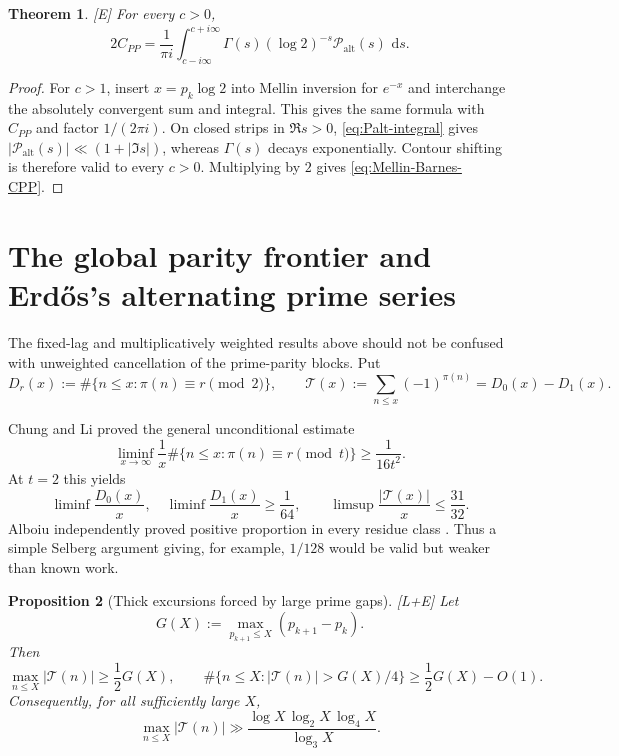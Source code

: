 \documentclass[11pt]{article}
\newtheorem{theorem}{Theorem}[section]
\newtheorem{proposition}[theorem]{Proposition}
\theoremstyle{definition}
\theoremstyle{remark}
\newcommand{\Palt}{\mathcal P_{\mathrm{alt}}}
\newcommand{\status}[1]{\textnormal{\textcolor{accent}{\footnotesize[#1]}}}
\newcommand{\dd}{\,\mathrm d}
\begin{document}
\begin{theorem}\label{thm:Mellin-Barnes-CPP}
\status{E}
For every $c>0$,
\begin{equation}\label{eq:Mellin-Barnes-CPP}
 2C_{PP}=\frac1{\pi i}
 \int_{c-i\infty}^{c+i\infty}
 \Gamma(s)(\log2)^{-s}\Palt(s)\,\dd s.
\end{equation}
\end{theorem}

\begin{proof}
For $c>1$, insert $x=p_k\log2$ into Mellin inversion for $e^{-x}$ and interchange the
absolutely convergent sum and integral.  This gives the same formula with $C_{PP}$ and
factor $1/(2\pi i)$.  On closed strips in $\Re s>0$, \eqref{eq:Palt-integral} gives
$|\Palt(s)|\ll(1+|\Im s|)$, whereas $\Gamma(s)$ decays exponentially.  Contour shifting
is therefore valid to every $c>0$.  Multiplying by $2$ gives
\eqref{eq:Mellin-Barnes-CPP}.
\end{proof}

\section{The global parity frontier and Erd\H{o}s's alternating prime series}

The fixed-lag and multiplicatively weighted results above should not be confused with
unweighted cancellation of the prime-parity blocks.  Put
\begin{equation}\label{eq:Tpi}
 D_r(x):=\#\{n\le x:\pi(n)\equiv r\pmod2\},
 \qquad
 \mathcal T(x):=\sum_{n\le x}(-1)^{\pi(n)}=D_0(x)-D_1(x).
\end{equation}

Chung and Li proved the general unconditional estimate \cite{ChungLi}
\begin{equation}\label{eq:Chung-Li}
 \liminf_{x\to\infty}\frac1x
 \#\{n\le x:\pi(n)\equiv r\pmod t\}
 \ge\frac1{16t^2}.
\end{equation}
At $t=2$ this yields
\begin{equation}\label{eq:parity-positive-density}
 \liminf\frac{D_0(x)}x,\quad \liminf\frac{D_1(x)}x\ge\frac1{64},
 \qquad
 \limsup\frac{|\mathcal T(x)|}{x}\le\frac{31}{32}.
\end{equation}
Alboiu independently proved positive proportion in every residue class
\cite{Alboiu}.  Thus a simple Selberg argument giving, for example, $1/128$ would be
valid but weaker than known work.

\begin{proposition}[Thick excursions forced by large prime gaps]
\label{prop:thick-parity-excursions}
\status{L+E}
Let
\[
 G(X):=\max_{p_{k+1}\le X}(p_{k+1}-p_k).
\]
Then
\begin{equation}\label{eq:thick-parity-excursions}
 \max_{n\le X}|\mathcal T(n)|\ge\frac12G(X),
 \qquad
 \#\{n\le X:|\mathcal T(n)|>G(X)/4\}
 \ge\frac12G(X)-O(1).
\end{equation}
Consequently, for all sufficiently large $X$,
\begin{equation}\label{eq:FGKMT-parity-excursion}
 \max_{n\le X}|\mathcal T(n)|
 \gg\frac{\log X\,\log_2X\,\log_4X}{\log_3X}.
\end{equation}
\end{proposition}
\end{document}
